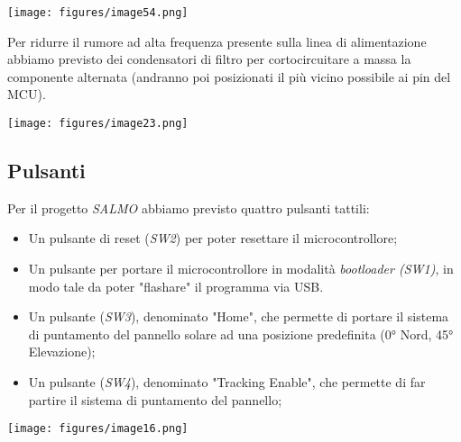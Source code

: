 \begin{center}
\texttt{[image: figures/image54.png]}
\captionsetup{type=figure}
\end{center}

\noindent Per ridurre il rumore ad alta frequenza presente sulla linea di
alimentazione abbiamo previsto dei condensatori di filtro per
cortocircuitare a massa la componente alternata (andranno poi
posizionati il più vicino possibile ai pin del MCU).

\begin{center}
\texttt{[image: figures/image23.png]}
\captionsetup{type=figure}
\end{center}

\hypertarget{pulsanti}{%
\subsection{\texorpdfstring{Pulsanti}{ Pulsanti}}\label{pulsanti}}

Per il progetto \emph{SALMO} abbiamo previsto quattro pulsanti tattili:

\begin{itemize}
\item
  
  Un pulsante di reset (\emph{SW2}) per poter resettare il
  microcontrollore;
  
\item
  
  Un pulsante per portare il microcontrollore in modalità
  \emph{bootloader (SW1)}, in modo tale da poter "flashare" il
  programma via USB.
  
\item
  
  Un pulsante (\emph{SW3}), denominato "Home", che permette di portare
  il sistema di puntamento del pannello solare ad una posizione
  predefinita (0° Nord, 45° Elevazione);
  
\item
  
  Un pulsante (\emph{SW4}), denominato "Tracking Enable", che permette
  di far partire il sistema di puntamento del pannello;
  
\end{itemize}

\begin{center}
  \texttt{[image: figures/image16.png]}
  \captionsetup{type=figure}
\end{center}

